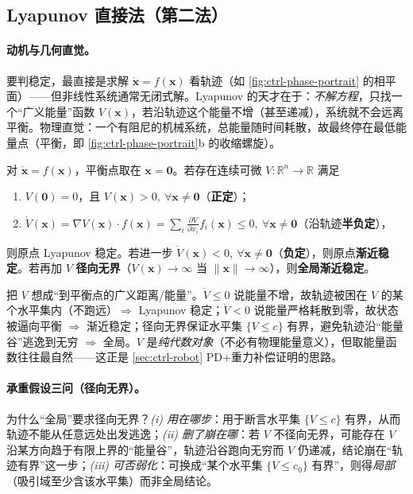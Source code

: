 \subsection{Lyapunov 直接法（第二法）}
\label{sec:ctrl-lyap-direct}

\paragraph{动机与几何直觉。}
要判稳定，最直接是求解 $\dot{\mathbf{x}}=f(\mathbf{x})$ 看轨迹（如 \cref{fig:ctrl-phase-portrait} 的相平面）——但非线性系统通常无闭式解。Lyapunov 的天才在于：\emph{不解方程}，只找一个“广义能量”函数 $V(\mathbf{x})$，若沿轨迹这个能量不增（甚至递减），系统就不会远离平衡。物理直觉：一个有阻尼的机械系统，总能量随时间耗散，故最终停在最低能量点（平衡，即 \cref{fig:ctrl-phase-portrait}b 的收缩螺旋）。

\begin{theorem}
\label{thm:ctrl-lyap-direct}
对 $\dot{\mathbf{x}}=f(\mathbf{x})$，平衡点取在 $\mathbf{x}=\mathbf{0}$。若存在连续可微 $V:\mathbb{R}^n\to\mathbb{R}$ 满足
\begin{enumerate}
  \item $V(\mathbf{0})=0$，且 $V(\mathbf{x})>0,\ \forall\mathbf{x}\neq\mathbf{0}$（\textbf{正定}）；
  \item $\dot V(\mathbf{x})=\nabla V(\mathbf{x})\cdot f(\mathbf{x})=\sum_{i}\frac{\partial V}{\partial x_i}f_i(\mathbf{x})\le0,\ \forall\mathbf{x}\neq\mathbf{0}$（沿轨迹\textbf{半负定}），
\end{enumerate}
则原点 Lyapunov 稳定。若进一步 $\dot V(\mathbf{x})<0,\ \forall\mathbf{x}\neq\mathbf{0}$（\textbf{负定}），则原点\textbf{渐近稳定}。若再加 $V$ \textbf{径向无界}（$V(\mathbf{x})\to\infty$ 当 $\|\mathbf{x}\|\to\infty$），则\textbf{全局渐近稳定}。
\end{theorem}

\begin{insight}
把 $V$ 想成“到平衡点的广义距离/能量”。$\dot V\le0$ 说能量不增，故轨迹被困在 $V$ 的某个水平集内（不跑远）$\Rightarrow$ Lyapunov 稳定；$\dot V<0$ 说能量严格耗散到零，故状态被逼向平衡 $\Rightarrow$ 渐近稳定；径向无界保证水平集 $\{V\le c\}$ 有界，避免轨迹沿“能量谷”逃逸到无穷 $\Rightarrow$ 全局。$V$ 是\emph{纯代数对象}（不必有物理能量意义），但取能量函数往往最自然——这正是 \cref{sec:ctrl-robot} PD+重力补偿证明的思路。
\end{insight}

\paragraph{承重假设三问（径向无界）。}
为什么“全局”要求径向无界？\emph{(i) 用在哪步}：用于断言水平集 $\{V\le c\}$ 有界，从而轨迹不能从任意远处出发逃逸；\emph{(ii) 删了崩在哪}：若 $V$ 不径向无界，可能存在 $V$ 沿某方向趋于有限上界的“能量谷”，轨迹沿谷跑向无穷而 $V$ 仍递减，结论崩在“轨迹有界”这一步；\emph{(iii) 可否弱化}：可换成“某个水平集 $\{V\le c_0\}$ 有界”，则得\emph{局部}（吸引域至少含该水平集）而非全局结论。

